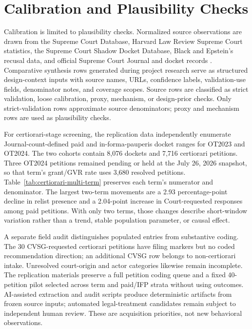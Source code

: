 \documentclass[
    journal=jlc,
    manuscript=research-article,
    year=2026,
  ]{cup-journal}
\newcommand{\jlcite}[1]{\autocite{#1}}
\newcommand{\jlcite}[1]{\citep{#1}}
\begin{document}
\section{Calibration and Plausibility Checks}

Calibration is limited to plausibility checks. Normalized source observations are drawn from the Supreme Court Database, Harvard Law Review Supreme Court statistics, the Supreme Court Shadow Docket Database, Black and Epstein's recusal data, and official Supreme Court Journal and docket records \jlcite{SupremeCourtDatabaseCodebook2025,HarvardLawReviewStatistics2025,ShadowDocketDatabase2025,BlackEpsteinRecusal,SupremeCourtJournalOT2023,SupremeCourtJournalOT2024,SupremeCourtDocketOT2023,SupremeCourtDocketOT2024}. Comparative synthesis rows generated during project research serve as structured design-context inputs with source names, URLs, confidence labels, validation-use fields, denominator notes, and coverage scopes. Source rows are classified as strict validation, loose calibration, proxy, mechanism, or design-prior checks. Only strict-validation rows approximate source denominators; proxy and mechanism rows are used as plausibility checks.

For certiorari-stage screening, the replication data independently enumerate Journal-count-defined paid and in-forma-pauperis docket ranges for OT2023 and OT2024. The two cohorts contain 8,076 dockets and 7,716 certiorari petitions. Three OT2024 petitions remained pending or held at the July 26, 2026 snapshot, so that term's grant/GVR rate uses 3,680 resolved petitions. Table~\ref{tab:certiorari-multi-term} preserves each term's numerator and denominator. The largest two-term movements are a 2.93 percentage-point decline in relist presence and a 2.04-point increase in Court-requested responses among paid petitions. With only two terms, those changes describe short-window variation rather than a trend, stable population parameter, or causal effect.

A separate field audit distinguishes populated entries from substantive coding. The 30 CVSG-requested certiorari petitions have filing markers but no coded recommendation direction; an additional CVSG row belongs to non-certiorari intake. Unresolved court-origin and actor categories likewise remain incomplete. The replication materials preserve a full petition coding queue and a fixed 40-petition pilot selected across term and paid/IFP strata without using outcomes. AI-assisted extraction and audit scripts produce deterministic artifacts from frozen source inputs; automated legal-treatment candidates remain subject to independent human review. These are acquisition priorities, not new behavioral observations.
\end{document}
